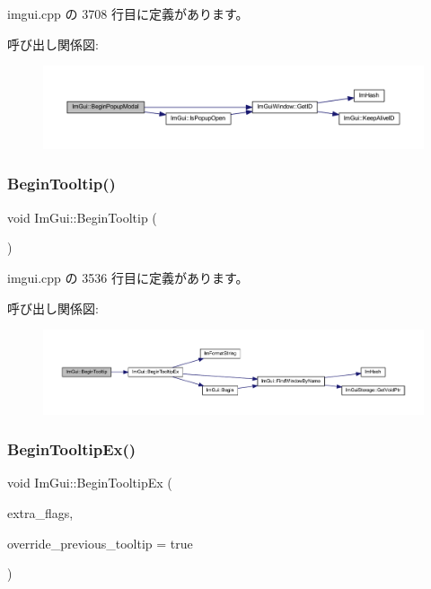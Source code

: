  imgui.\+cpp の 3708 行目に定義があります。

呼び出し関係図\+:\nopagebreak
\begin{figure}[H]
\begin{center}
\leavevmode
\includegraphics[width=350pt]{namespace_im_gui_aa70aaf1dacf5702f85feca6f729a307a_cgraph}
\end{center}
\end{figure}
\mbox{\label{namespace_im_gui_a36816a48385f4759d746a03cf6202512}} 
\subsubsection{\texorpdfstring{Begin\+Tooltip()}{BeginTooltip()}}
{\footnotesize\ttfamily void Im\+Gui\+::\+Begin\+Tooltip (\begin{DoxyParamCaption}{ }\end{DoxyParamCaption})}



 imgui.\+cpp の 3536 行目に定義があります。

呼び出し関係図\+:\nopagebreak
\begin{figure}[H]
\begin{center}
\leavevmode
\includegraphics[width=350pt]{namespace_im_gui_a36816a48385f4759d746a03cf6202512_cgraph}
\end{center}
\end{figure}
\mbox{\label{namespace_im_gui_a3189530b7795a9b99169eb95f36c516d}} 
\subsubsection{\texorpdfstring{Begin\+Tooltip\+Ex()}{BeginTooltipEx()}}
{\footnotesize\ttfamily void Im\+Gui\+::\+Begin\+Tooltip\+Ex (\begin{DoxyParamCaption}\item[{\mbox{\hyperlink{imgui_8h_a0b8e067ab4f7a818828c8d89e531addc}{Im\+Gui\+Window\+Flags}}}]{extra\+\_\+flags,  }\item[{bool}]{override\+\_\+previous\+\_\+tooltip = {\ttfamily true} }\end{DoxyParamCaption})}




